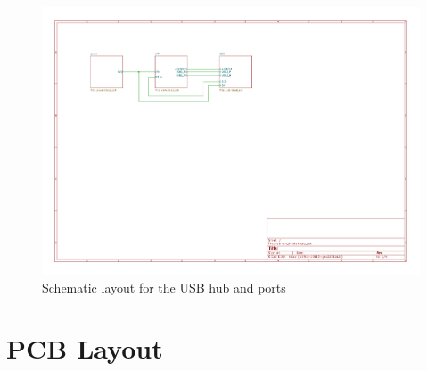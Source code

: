 \begin{figure}[h]
  \centering
  \includegraphics[height=1\textwidth,angle=90,page=4]{Figures/kicad/lathrum_thesis_schematic.pdf}
  \captionsetup{width=1\linewidth}
  \caption[USB Schematic]{Schematic layout for the USB hub and ports}
  \label{app:pcb_schematic_usb}
\end{figure}

\clearpage
\section{PCB Layout}

